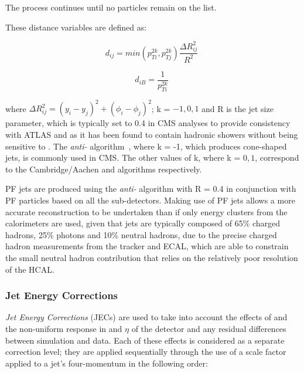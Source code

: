The process continues until no particles remain on the list.

These distance variables are defined as:

\begin{equation}
d_{ij} = min(p^{2k}_{Ti},p^{2k}_{Tj}) \frac{\Delta R^{2}_{ij}}{R^{2}} \;
\label{eq:jetAlgo1}
\end{equation}

\begin{equation}
d_{iB} = \frac{1}{p^{2k}_{Ti}} \;
\label{eq:jetAlgo2}
\end{equation}

where $\Delta R^{2}_{ij} = (y_{i} - y_{j})^{2} + (\phi_{i} - \phi_{j})^{2}$; k = ${-1, 0, 1}$ and R is the jet size parameter, which is typically set to 0.4 in CMS analyses to provide consistency with ATLAS and as it has been found to contain hadronic showers without being sensitive to \PU.
The \emph{anti-\kt} algorithm~\cite{Cacciari:2008gp}, where k = -1, which produces cone-shaped jets, is commonly used in CMS.
The other values of k, where k = $0,1$, correspond to the Cambridge/Aachen and \kt algorithms respectively.

PF jets are produced using the \emph{anti-\kt} algorithm with R = 0.4 in conjunction with PF particles based on all the sub-detectors.
Making use of PF jets allows a more accurate reconstruction to be undertaken than if only energy clusters from the calorimeters are used, given that jets are typically composed of 65\% charged hadrons, 25\% photons and 10\% neutral hadrons, due to the precise charged hadron measurements from the tracker and ECAL, which are able to constrain the small neutral hadron contribution that relies on the relatively poor resolution of the HCAL.

\subsubsection{Jet Energy Corrections}\label{subsubsec:JECs}
\emph{Jet Energy Corrections} (JECs) are used to take into account the effects of \PU and the non-uniform response in \pT and $\eta$ of the detector and any residual differences between simulation and data.
Each of these effects is considered as a separate correction level; they are applied sequentially through the use of a scale factor applied to a jet's four-momentum in the following order:

